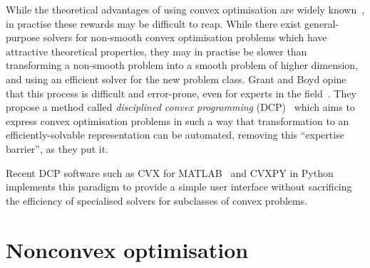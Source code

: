 While the theoretical advantages of using convex optimisation are widely known~\cite{Luo06}, in practise these rewards may be difficult to reap.
While there exist general-purpose solvers for non-smooth convex optimisation problems which have attractive theoretical properties, they may in practise be slower than transforming a non-smooth problem into a smooth problem of higher dimension, and using an efficient solver for the new problem class.
Grant and Boyd opine that this process is difficult and error-prone, even for experts in the field~\cite{Grant08}.
They propose a method called \emph{disciplined convex programming} (DCP)~\cite{Grant06} which aims to express convex optimisation problems in such a way that transformation to an efficiently-solvable representation can be automated, removing this ``expertise barrier'', as they put it.

Recent DCP software such as CVX for MATLAB~\cite{CVX} and CVXPY in Python~\cite{CVXPY} implements this paradigm to provide a simple user interface without sacrificing the efficiency of specialised solvers for subclasses of convex problems.

\section{Nonconvex optimisation}

